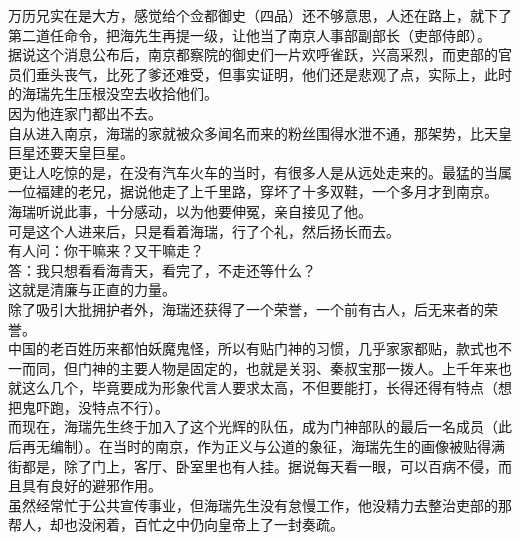 \begin{multicols}{\theparacolNo}
万历兄实在是大方，感觉给个佥都御史（四品）还不够意思，人还在路上，就下了第二道任命令，把海先生再提一级，让他当了南京人事部副部长（吏部侍郎）。\\

据说这个消息公布后，南京都察院的御史们一片欢呼雀跃，兴高采烈，而吏部的官员们垂头丧气，比死了爹还难受，但事实证明，他们还是悲观了点，实际上，此时的海瑞先生压根没空去收拾他们。\\

因为他连家门都出不去。\\

自从进入南京，海瑞的家就被众多闻名而来的粉丝围得水泄不通，那架势，比天皇巨星还要天皇巨星。\\

更让人吃惊的是，在没有汽车火车的当时，有很多人是从远处走来的。最猛的当属一位福建的老兄，据说他走了上千里路，穿坏了十多双鞋，一个多月才到南京。\\

海瑞听说此事，十分感动，以为他要伸冤，亲自接见了他。\\

可是这个人进来后，只是看着海瑞，行了个礼，然后扬长而去。\\

有人问：你干嘛来？又干嘛走？\\

答：我只想看看海青天，看完了，不走还等什么？\\

这就是清廉与正直的力量。\\

除了吸引大批拥护者外，海瑞还获得了一个荣誉，一个前有古人，后无来者的荣誉。\\

中国的老百姓历来都怕妖魔鬼怪，所以有贴门神的习惯，几乎家家都贴，款式也不一而同，但门神的主要人物是固定的，也就是关羽、秦叔宝那一拨人。上千年来也就这么几个，毕竟要成为形象代言人要求太高，不但要能打，长得还得有特点（想把鬼吓跑，没特点不行）。\\

而现在，海瑞先生终于加入了这个光辉的队伍，成为门神部队的最后一名成员（此后再无编制）。在当时的南京，作为正义与公道的象征，海瑞先生的画像被贴得满街都是，除了门上，客厅、卧室里也有人挂。据说每天看一眼，可以百病不侵，而且具有良好的避邪作用。\\

虽然经常忙于公共宣传事业，但海瑞先生没有怠慢工作，他没精力去整治吏部的那帮人，却也没闲着，百忙之中仍向皇帝上了一封奏疏。\\


\end{multicols}
